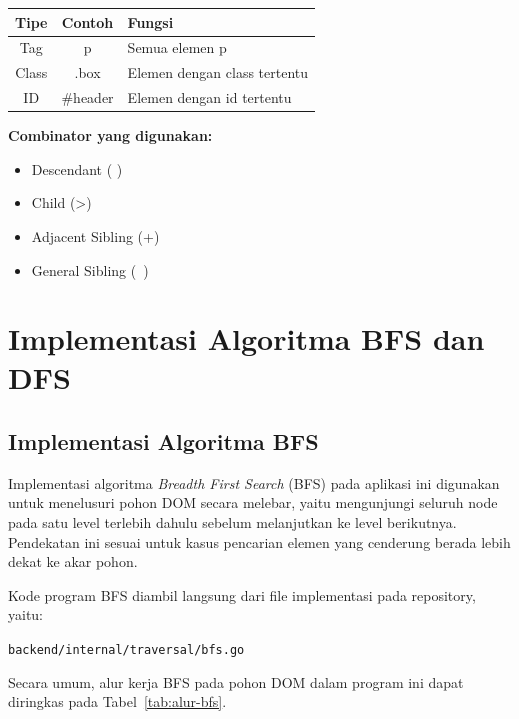 \begin{center}
\begin{tabular}{|c|c|l|}
\hline
Tipe & Contoh & Fungsi \\
\hline
Tag & p & Semua elemen p \\
Class & .box & Elemen dengan class tertentu \\
ID & \#header & Elemen dengan id tertentu \\
\hline
\end{tabular}
\end{center}

\textbf{Combinator yang digunakan:}
\begin{itemize}
    \item Descendant ( )
    \item Child (>)
    \item Adjacent Sibling (+)
    \item General Sibling (~)
\end{itemize}


\section{Implementasi Algoritma BFS dan DFS}
\subsection{Implementasi Algoritma BFS}

Implementasi algoritma \textit{Breadth First Search} (BFS) pada aplikasi ini digunakan untuk menelusuri pohon DOM secara melebar, yaitu mengunjungi seluruh node pada satu level terlebih dahulu sebelum melanjutkan ke level berikutnya. Pendekatan ini sesuai untuk kasus pencarian elemen yang cenderung berada lebih dekat ke akar pohon.

Kode program BFS diambil langsung dari file implementasi pada repository, yaitu:

\begin{tcolorbox}[colback=gray!10,title=Lokasi File Implementasi BFS]
\texttt{backend/internal/traversal/bfs.go}
\end{tcolorbox}



Secara umum, alur kerja BFS pada pohon DOM dalam program ini dapat diringkas pada Tabel~\ref{tab:alur-bfs}.

